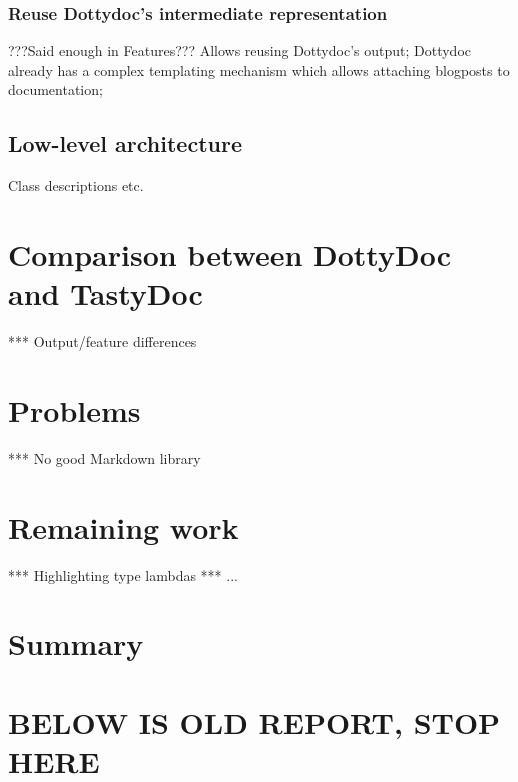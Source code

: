 \documentclass{report}
\begin{document}
\subsection{Reuse Dottydoc's intermediate representation}
???Said enough in Features???
Allows reusing Dottydoc's output;
Dottydoc already has a complex templating mechanism which allows 
attaching blogposts to documentation;

\section{Low-level architecture}
Class descriptions etc.

\chapter{Comparison between DottyDoc and TastyDoc}
*** Output/feature differences

\chapter{Problems}
*** No good Markdown library

\chapter{Remaining work}
*** Highlighting type lambdas
*** ...

\chapter{Summary}


\chapter{BELOW IS OLD REPORT, STOP HERE}
\end{document}
